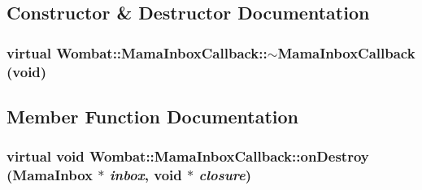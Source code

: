 \subsection{Constructor \& Destructor Documentation}
\hypertarget{classWombat_1_1MamaInboxCallback_a1badebc408c69ff79d1e2889e090e46b}{
\subsubsection[{$\sim$MamaInboxCallback}]{\setlength{\rightskip}{0pt plus 5cm}virtual Wombat::MamaInboxCallback::$\sim$MamaInboxCallback (void)}}
\label{classWombat_1_1MamaInboxCallback_a1badebc408c69ff79d1e2889e090e46b}


\subsection{Member Function Documentation}
\hypertarget{classWombat_1_1MamaInboxCallback_a44bb84d0fd2f693f01dbe816cfbae691}{
\subsubsection[{onDestroy}]{\setlength{\rightskip}{0pt plus 5cm}virtual void Wombat::MamaInboxCallback::onDestroy ({\bf MamaInbox} $\ast$ {\em inbox}, \/  void $\ast$ {\em closure})}}
\label{classWombat_1_1MamaInboxCallback_a44bb84d0fd2f693f01dbe816cfbae691}



